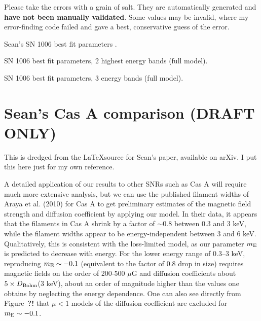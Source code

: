 \documentclass[iop, apj, numberedappendix, twocolappendix]{emulateapj}
\begin{document}
Please take the errors with a grain of salt.  They are automatically
generated and \textbf{have not been manually validated}.  Some values may be
invalid, where my error-finding code failed and gave a best, conservative guess
of the error.

\begin{table}[ht]
    \tiny
    \centering
    \caption{Sean's SN 1006 best fit parameters .
    \label{tab:sean}}
    
\end{table}

\begin{table*}[ht]
    \tiny
    \centering
    \caption{SN 1006 best fit parameters, 2 highest energy bands (full model).
    \label{tab:sn1006-2band}}
    
\end{table*}

\begin{table*}[ht]
    \tiny
    \centering
    \caption{SN 1006 best fit parameters, 3 energy bands (full model).
    \label{tab:sn1006-3band}}
    
\end{table*}


\section{Sean's Cas A comparison (DRAFT ONLY)}

This is dredged from the \LaTeX source for Sean's paper, available on arXiv.
I put this here just for my own reference.

A detailed application of our results to other SNRs such as Cas A will
require much more extensive analysis, but we can use the published
filament widths of Araya et al. (2010) for Cas A to get preliminary
estimates of the magnetic field strength and diffusion coefficient by
applying our model. In their data, it appears that the filaments in
Cas A shrink by a factor of $\sim 0.8$ between 0.3 and 3 keV, while the
filament widths appear to be energy-independent between 3 and 6 keV.
Qualitatively, this is consistent with the loss-limited model, as our
parameter $m_{\rm E}$ is predicted to decrease with energy.  For the
lower energy range of 0.3--3 keV, reproducing $m_{\rm E}\sim -0.1$
(equivalent to the factor of 0.8 drop in size) requires magnetic
fields on the order of 200-500 $\mu$G and diffusion coefficients about
$5 \times D_{\rm Bohm}$(3 keV), about an order of magnitude higher
than the values one obtains by neglecting the energy dependence. One
can also see directly from Figure~\textbf{?!} that $\mu < 1$ models
of the diffusion coefficient are excluded for $m_{\rm E}\sim -0.1$.
\end{document}
